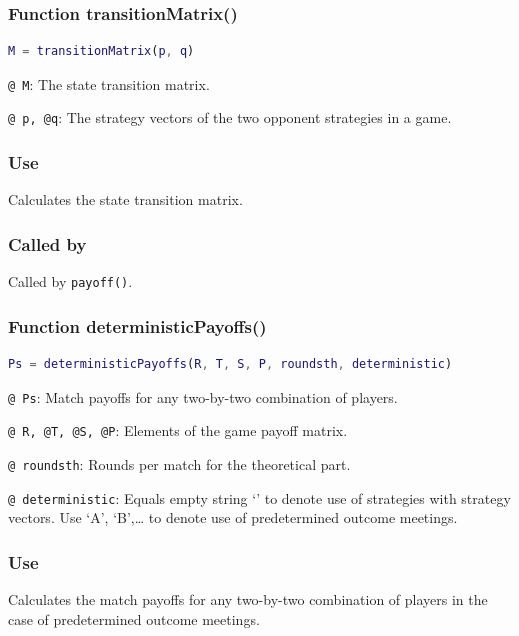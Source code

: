 \documentclass[12pt]{report}
\begin{document}
\subsubsection*{Function transitionMatrix()}

\begin{lstlisting}[language=Matlab]
M = transitionMatrix(p, q)

\end{lstlisting}

\texttt{@ M}: The state transition matrix.

\texttt{@ p, @q}: The strategy vectors of the two opponent strategies in a game.

\subsubsection*{Use}
Calculates the state transition matrix.

\subsubsection*{Called by}
Called by \texttt{payoff()}.







\subsubsection*{Function deterministicPayoffs()}

\begin{lstlisting}[language=Matlab]
Ps = deterministicPayoffs(R, T, S, P, roundsth, deterministic)

\end{lstlisting}

\texttt{@ Ps}: Match payoffs for any two-by-two combination of players.

\texttt{@ R, @T, @S, @P}: Elements of the game payoff matrix.

\texttt{@ roundsth}: Rounds per match for the theoretical part.

\texttt{@ deterministic}: Equals empty string ‘’ to denote use of strategies with strategy vectors. Use ‘A’, ‘B',… to denote use of predetermined outcome meetings.

\subsubsection*{Use}
Calculates the match payoffs for any two-by-two combination of players in the case of predetermined outcome meetings.
\end{document}
